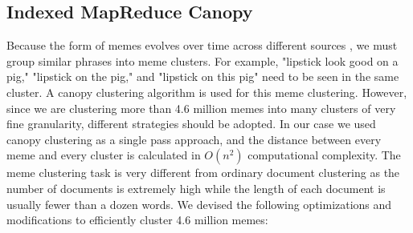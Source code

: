\documentclass{sig-alternate}
\begin{document}
\subsection{Indexed MapReduce Canopy}
Because the form of memes evolves over time across different sources \cite{Leskovec2009}, we must group similar phrases into meme clusters. For example, "lipstick look good on a pig," "lipstick on the pig," and "lipstick on this pig" need to be seen in the same cluster. A canopy clustering algorithm \cite{McCallum2000} is used for this meme clustering. However, since we are clustering more than 4.6 million memes into many clusters of very fine granularity, different strategies should be adopted. In our case we used canopy clustering as a single pass approach, and the distance between every meme and every cluster is calculated in $O(n^2)$ computational complexity. The meme clustering task is very different from ordinary document clustering as the number of documents is extremely high while the length of each document is usually fewer than a dozen words. We devised the following optimizations and modifications to efficiently cluster 4.6 million memes:
\end{document}
